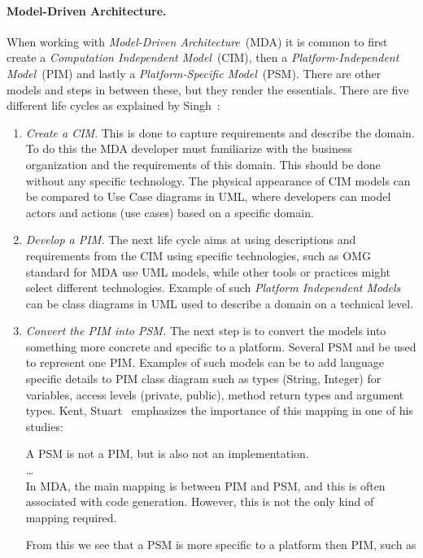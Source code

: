 \paragraph{Model-Driven Architecture.}


When working with \emph{Model-Driven Architecture}~(MDA) it is common to first create a
\emph{Computation Independent Model}~(CIM), then a \emph{Platform-Independent Model}~(PIM) and
lastly a \emph{Platform-Specific Model}~(PSM). There are other models and steps in between these,
but they render the essentials.
There are five different life cycles as explained by Singh~\cite{model-driven:singh09}:
\begin{enumerate}
  \item \emph{Create a CIM}.
    This is done to capture requirements and describe the domain.
    To do this the MDA developer must familiarize with the business organization
    and the requirements of this domain. This should be done without any specific technology.
    The physical appearance of CIM models can be compared to Use Case diagrams in UML,
    where developers can model actors and actions (use cases) based on a specific domain.
  \item \emph{Develop a PIM.}
    The next life cycle aims at using descriptions and requirements from the CIM
    using specific technologies, such as OMG standard for MDA use UML models,
    while other tools or practices might select different technologies.
    Example of such \emph{Platform Independent Models} can be class diagrams in UML
    used to describe a domain on a technical level.
  \item \emph{Convert the PIM into PSM.}
    The next step is to convert the models into something more concrete
    and specific to a platform. Several PSM and be used to represent one PIM.
    Examples of such models can be to add language specific details to PIM class
    diagram such as types (String, Integer) for variables, access levels (private, public),
    method return types and argument types.
    Kent, Stuart~\cite{modeldriven:kent02} emphasizes the importance 
    of this mapping in one of his studies:
    \epigraph{
      A PSM is not a PIM, but is also not an implementation. \\
      \ldots \\
      In MDA, the main mapping is between PIM
      and PSM, and this is often associated with code generation. 
      However, this is not the only kind of mapping required.
    }{}
    From this we see that a PSM is more specific to a platform then PIM, such as 

\end{enumerate}
